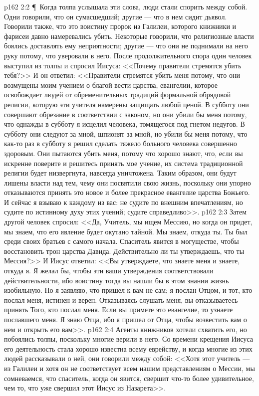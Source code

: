 \vs p162 2:2 \P\ Когда толпа услышала эти слова, люди стали спорить между собой. Одни говорили, что он сумасшедший; другие --- что в нем сидит дьявол. Говорили также, что это воистину пророк из Галилеи, которого книжники и фарисеи давно намеревались убить. Некоторые говорили, что религиозные власти боялись доставлять ему неприятности; другие --- что они не поднимали на него руку потому, что уверовали в него. После продолжительного спора один человек выступил из толпы и спросил Иисуса: <<Почему правители стремятся убить тебя?>> И он ответил: <<Правители стремятся убить меня потому, что они возмущены моим учением о благой вести царства, евангелии, которое освобождает людей от обременительных традиций формальной обрядовой религии, которую эти учителя намерены защищать любой ценой. В субботу они совершают обрезание в соответствии с законом, но они убили бы меня потому, что однажды в субботу я исцелил человека, томящегося под гнетом недугов. В субботу они следуют за мной, шпионят за мной, но убили бы меня потому, что как\hyp{}то раз в субботу я решил сделать тяжело больного человека совершенно здоровым. Они пытаются убить меня, потому что хорошо знают, что, если вы искренне поверите и решитесь принять мое учение, их система традиционной религии будет низвергнута, навсегда уничтожена. Таким образом, они будут лишены власти над тем, чему они посвятили свою жизнь, поскольку они упорно отказываются принять это новое и более прекрасное евангелие царства Божьего. И сейчас я взываю к каждому из вас: не судите по внешним впечатлениям, но судите по истинному духу этих учений; судите справедливо>>.
\vs p162 2:3 Затем другой человек спросил: <<Да, Учитель, мы ищем Мессию, но когда он придет, мы знаем, что его явление будет окутано тайной. Мы знаем, откуда ты. Ты был среди своих братьев с самого начала. Спаситель явится в могуществе, чтобы восстановить трон царства Давида. Действительно ли ты утверждаешь, что ты Мессия?>> И Иисус ответил: <<Вы утверждаете, что знаете меня и знаете, откуда я. Я желал бы, чтобы эти ваши утверждения соответствовали действительности, ибо воистину тогда вы нашли бы в этом знании жизнь изобильную. Но я заявляю, что пришел к вам не сам; я послан Отцом, и тот, кто послал меня, истинен и верен. Отказываясь слушать меня, вы отказываетесь принять Того, кто послал меня. Если вы примете это евангелие, то узнаете пославшего меня. Я знаю Отца, ибо я пришел от Отца, чтобы возвестить вам о нем и открыть его вам>>.
\vs p162 2:4 Агенты книжников хотели схватить его, но побоялись толпы, поскольку многие верили в него. Со времени крещения Иисуса его деятельность стала хорошо известна всему еврейству, и когда многие из этих людей рассказывали о ней, они говорили между собой: <<Хотя этот учитель --- из Галилеи и хотя он не соответствует всем нашим представлениям о Мессии, мы сомневаемся, что спаситель, когда он явится, свершит что\hyp{}то более удивительное, чем то, что уже свершил этот Иисус из Назарета>>.
